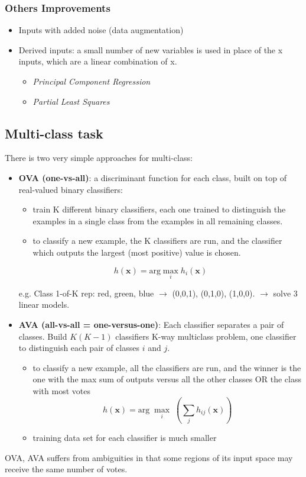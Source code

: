 \documentclass[../main.tex]{subfiles}
\begin{document}
\subsubsection{Others Improvements}
\begin{itemize}
    \item Inputs with added noise (data augmentation)
    \item Derived inputs: a small number of new variables is used in place of the x inputs, which are a linear combination of x.
    \begin{itemize}
        \item \textit{Principal Component Regression}
        \item \textit{Partial Least Squares}
    \end{itemize}
\end{itemize}

\subsection{Multi-class task}
There is two very simple approaches for multi-class:

\begin{itemize}
    \item \textbf{OVA (one-vs-all)}: a discriminant function for each class, built on top of real-valued binary classifiers:
    \begin{itemize}
        \item train K different binary classifiers, each one trained to distinguish the examples in a single class from the examples in all remaining classes.
        \item to classify a new example, the K classifiers are run, and the classifier which outputs the largest (most positive) value is chosen.
    \end{itemize}
        $$ h(\mathbf{x}) = \mbox{arg}\max_{i}h_i(\mathbf{x})$$ 

    e.g. Class 1-of-K rep: {red, green, blue} $\rightarrow$ (0,0,1), (0,1,0), (1,0,0). $\rightarrow$ solve 3 linear models.
    
    \item \textbf{AVA (all-vs-all = one-versus-one)}:
    Each classifier separates a pair of classes. Build $K(K-1)$ classifiers K-way multiclass problem, one classifier to distinguish each pair of classes $i$ and $j$.
    \begin{itemize}
        \item to classify a new example, all the classifiers are run, and the winner is the one with the
                max sum of outputs versus all the other classes OR the class with most votes
        $$ h(\mathbf{x}) = \mbox{arg}\;\max_{i} \; (\sum_{j}^{} h_{ij}(\mathbf{x}))$$ 
        \item training data set for each classifier is much smaller
    \end{itemize}
    
\end{itemize}
OVA, AVA suffers from ambiguities in that some regions of its input space may receive the same number of votes.\\
\end{document}
